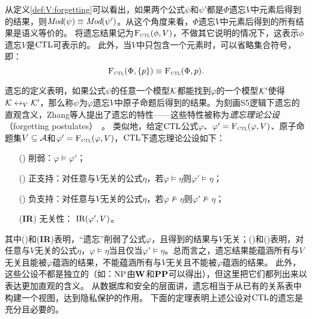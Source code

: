 从定义\ref{def:V:forgetting}可以看出，如果两个公式$\psi$和$\psi'$都是$\Phi$遗忘$V$中元素后得到的结果，则$\textit{Mod}(\psi)\equiv \textit{Mod}(\psi')$。从这个角度来看，$\Phi$遗忘$V$中元素后得到的所有结果是语义等价的。
将遗忘结果记为${\textsc{F}_{\textsc{ctl}}}(\phi,V)$，不做其它说明的情况下，这表示$\phi$遗忘$V$是$\textrm{CTL}$可表示的。
此外，当$V$中只包含一个元素时，可以省略集合符号，即：$${\textsc{F}_{\textsc{ctl}}}(\Phi, \{p\}) \equiv {\textsc{F}_{\textsc{ctl}}}(\Phi, p).$$ 



遗忘的定义表明，如果公式$\psi$的任意一个模型${\cal K}$都能找到$\varphi$的一个模型${\cal K}'$使得${\cal K} \leftrightarrow_V {\cal K}'$，那么称$\psi$为$\varphi$遗忘$V$中原子命题后得到的结果。为刻画S5逻辑下遗忘的直观含义，Zhang等人提出了遗忘的特性——这些特性被称为\emph{遗忘理论公设}（forgetting postulates）~\cite{Yan:AIJ:2009}。
类似地，给定$\textrm{CTL}$公式$\varphi$、$\varphi'={\textsc{F}_{\textsc{ctl}}}(\varphi, V)$、原子命题集$V\subseteq {\cal A}$和$\varphi'={\textsc{F}_{\textsc{ctl}}}(\varphi, V)$，$\textrm{CTL}$下遗忘理论公设如下：
\begin{itemize}
	\item[(\W)] 削弱：$\varphi \models \varphi'$；
	\item[(\PP)] 正支持：对任意与$V$无关的公式$\eta$，若$\varphi \models \eta$则$\varphi' \models \eta$；
	\item[(\NgP)] 负支持：对任意与$V$无关的公式$\eta$，若$\varphi \not \models \eta$则$\varphi' \not \models \eta$；
	\item[(\textbf{IR})] 无关性： $\textrm{IR}(\varphi', V)$。
\end{itemize}
其中(\W)和(\textbf{IR})表明，“遗忘”削弱了公式$\varphi$，且得到的结果与$V$无关；(\PP)和(\NgP)表明，对任意与$V$无关的公式$\eta$，$\varphi \models \eta$当且仅当$\varphi' \models \eta$。总而言之，遗忘结果能蕴涵所有与$V$无关且能被$\varphi$蕴涵的结果，不能蕴涵所有与$V$无关且不能被$\varphi$蕴涵的结果。
此外，这些公设不都是独立的（如：$\textmd{\rm NP}$由$\textbf{W}$和$\textbf{PP}$可以得出），但这里把它们都列出来以表达更加直观的含义。
从数据库和安全的层面讲，遗忘相当于从已有的关系表中构建一个视图，达到隐私保护的作用。
下面的定理表明上述公设对$\textrm{CTL}$的遗忘是充分且必要的。

